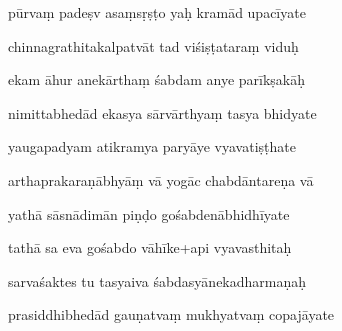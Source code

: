 \documentclass[article,12pt,a4paper]{memoir}%
\newcounter{parCount}
\begin{document}
	  
	  \pstart {} pūrvaṃ padeṣv asaṃsṛṣṭo yaḥ kramād upacīyate 
	{}
	\pend%
      

	  
	  \pstart \leavevmode%
	chinnagrathitakalpatvāt tad viśiṣṭataraṃ viduḥ 
	{}
	\pend%
      

	  
	  \pstart {} ekam āhur anekārthaṃ śabdam anye parīkṣakāḥ 
	{}
	\pend%
      

	  
	  \pstart \leavevmode%
	nimittabhedād ekasya sārvārthyaṃ tasya bhidyate 
	{}
	\pend%
      

	  
	  \pstart {} yaugapadyam atikramya paryāye vyavatiṣṭhate 
	{}
	\pend%
      

	  
	  \pstart \leavevmode%
	arthaprakaraṇābhyāṃ vā yogāc chabdāntareṇa vā 
	{}
	\pend%
      

	  
	  \pstart {} yathā sāsnādimān piṇḍo gośabdenābhidhīyate 
	{}
	\pend%
      

	  
	  \pstart \leavevmode%
	tathā sa eva gośabdo vāhīke+api vyavasthitaḥ 
	{}
	\pend%
      

	  
	  \pstart {} sarvaśaktes tu tasyaiva śabdasyānekadharmaṇaḥ 
	{}
	\pend%
      

	  
	  \pstart \leavevmode%
	prasiddhibhedād gauṇatvaṃ mukhyatvaṃ copajāyate 
	{}
	\pend%
      
\end{document}
